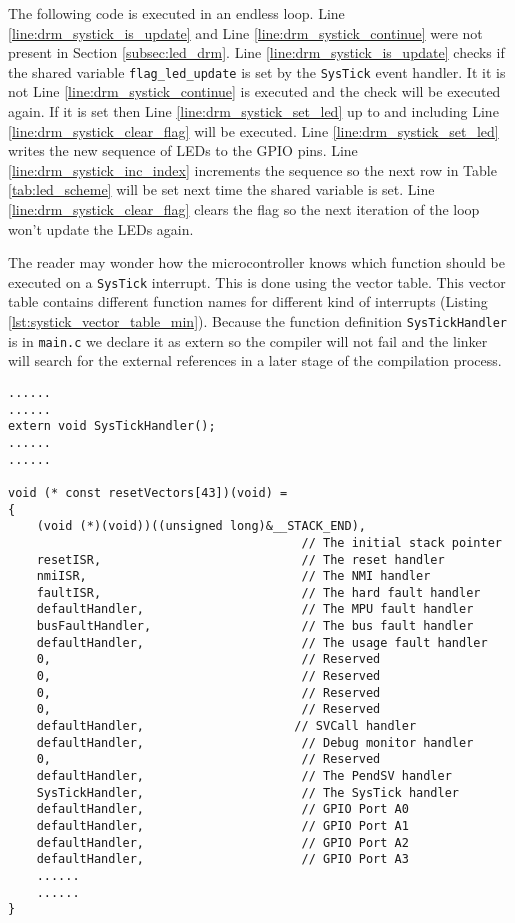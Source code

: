 The following code is executed in an endless loop.
Line \ref{line:drm_systick_is_update} and Line \ref{line:drm_systick_continue} were not present in Section \ref{subsec:led_drm}.
Line \ref{line:drm_systick_is_update} checks if the shared variable \texttt{flag\_led\_update} is set by the \texttt{SysTick} event handler. It it is not Line \ref{line:drm_systick_continue} is executed and the check will be executed again.
If it is set then Line \ref{line:drm_systick_set_led} up to and including Line \ref{line:drm_systick_clear_flag} will be executed.
Line \ref{line:drm_systick_set_led} writes the new sequence of LEDs to the GPIO pins.
Line \ref{line:drm_systick_inc_index} increments the sequence so the next row in Table \ref{tab:led_scheme} will be set next time the shared variable is set.
Line \ref{line:drm_systick_clear_flag} clears the flag so the next iteration of the loop won't update the LEDs again.

The reader may wonder how the microcontroller knows which function should be executed on a \texttt{SysTick} interrupt.
This is done using the vector table. This vector table contains different function names for different kind of interrupts (Listing \ref{lst:systick_vector_table_min}).
Because the function definition \texttt{SysTickHandler} is in \texttt{main.c} we declare it as extern so the compiler will not fail and the linker will search for the external references in a later stage of the compilation process.

\begin{lstlisting}[style=CStyle, caption={Part of \texttt{cc3220\_startup\_ccs.c} which contains a part of the vector table}, captionpos=b, label={lst:systick_vector_table_min}, escapechar=@]
......
......
extern void SysTickHandler();
......
......

void (* const resetVectors[43])(void) =
{
    (void (*)(void))((unsigned long)&__STACK_END),
                                         // The initial stack pointer
    resetISR,                            // The reset handler
    nmiISR,                              // The NMI handler
    faultISR,                            // The hard fault handler
    defaultHandler,                      // The MPU fault handler
    busFaultHandler,                     // The bus fault handler
    defaultHandler,                      // The usage fault handler
    0,                                   // Reserved
    0,                                   // Reserved
    0,                                   // Reserved
    0,                                   // Reserved
    defaultHandler,                     // SVCall handler
    defaultHandler,                      // Debug monitor handler
    0,                                   // Reserved
    defaultHandler,                      // The PendSV handler
    SysTickHandler,                      // The SysTick handler
    defaultHandler,                      // GPIO Port A0
    defaultHandler,                      // GPIO Port A1
    defaultHandler,                      // GPIO Port A2
    defaultHandler,                      // GPIO Port A3
    ......
    ......
}

\end{lstlisting}

